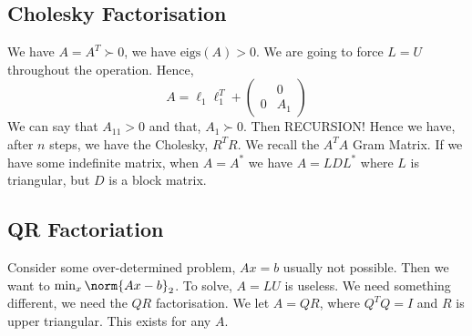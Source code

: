 \subsection{Cholesky Factorisation}
We have $A = A^T \succ 0$, we have $\mathrm{eigs}(A) > 0$. We are going to force $L = U$ throughout the operation. Hence,
$$ A = \ell_1\ell_1^T + \begin{pmatrix}
  & 0 \\
  0 & A_1
\end{pmatrix} $$
We can say that $A_{11} > 0$ and that, $A_1 \succ 0$. Then RECURSION! Hence we have, after $n$ steps, we have the Cholesky, $R^TR$. We recall the $A^TA$ Gram Matrix. If we have some indefinite matrix, when $A = A^*$ we have $A = LDL^*$ where $L$ is triangular, but $D$ is a block matrix.

\subsection{QR Factoriation}
Consider some over-determined problem, $Ax = b$ usually not possible. Then we want to $\min_x \norm{Ax - b}_2$. To solve, $A = LU$ is useless. We need something different, we need the $QR$ factorisation. We let $A = QR$, where $Q^TQ = I$ and $R$ is upper triangular. This exists for any $A$. \\

\noindent

